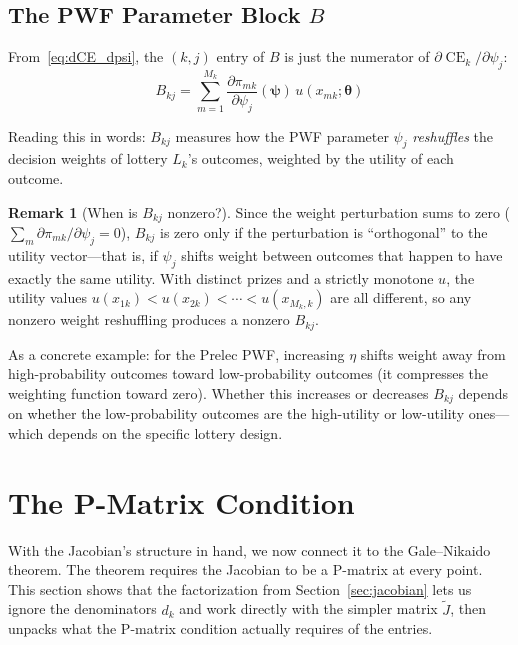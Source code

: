 \documentclass[11pt,a4paper]{article}
\theoremstyle{definition}
\newtheorem{remark}[theorem]{Remark}
\newcommand{\btheta}{\boldsymbol{\theta}}
\newcommand{\bpsi}{\boldsymbol{\psi}}
\DeclareMathOperator{\CE}{CE}
\begin{document}
\subsection{The PWF Parameter Block $B$}

From~\eqref{eq:dCE_dpsi}, the $(k, j)$ entry of $B$ is just the numerator
of $\partial \CE_k / \partial \psi_j$:
\begin{equation}
    \label{eq:B_entry}
    B_{kj} = \sum_{m=1}^{M_k}
    \frac{\partial \pi_{mk}}{\partial \psi_j}(\bpsi) \,
    u(x_{mk}; \btheta)
\end{equation}

Reading this in words: $B_{kj}$ measures how the PWF parameter $\psi_j$
\emph{reshuffles} the decision weights of lottery $L_k$'s outcomes, weighted
by the utility of each outcome.

\begin{remark}[When is $B_{kj}$ nonzero?]
\label{rem:B_interp}
Since the weight perturbation sums to zero
($\sum_m \partial\pi_{mk}/\partial\psi_j = 0$), $B_{kj}$ is zero only if
the perturbation is ``orthogonal'' to the utility vector---that is, if
$\psi_j$ shifts weight between outcomes that happen to have exactly the same
utility. With distinct prizes and a strictly monotone $u$, the utility values
$u(x_{1k}) < u(x_{2k}) < \cdots < u(x_{M_k,k})$ are all different, so any
nonzero weight reshuffling produces a nonzero $B_{kj}$.

As a concrete example: for the Prelec PWF, increasing $\eta$ shifts weight
away from high-probability outcomes toward low-probability outcomes (it
compresses the weighting function toward zero). Whether this increases or
decreases $B_{kj}$ depends on whether the low-probability outcomes are the
high-utility or low-utility ones---which depends on the specific lottery
design.
\end{remark}


\section{The P-Matrix Condition}
\label{sec:p_matrix}

With the Jacobian's structure in hand, we now connect it to the
Gale--Nikaido theorem. The theorem requires the Jacobian to be a P-matrix
at every point. This section shows that the factorization from
Section~\ref{sec:jacobian} lets us ignore the denominators $d_k$ and work
directly with the simpler matrix $\widetilde{J}$, then unpacks what the
P-matrix condition actually requires of the entries.
\end{document}
